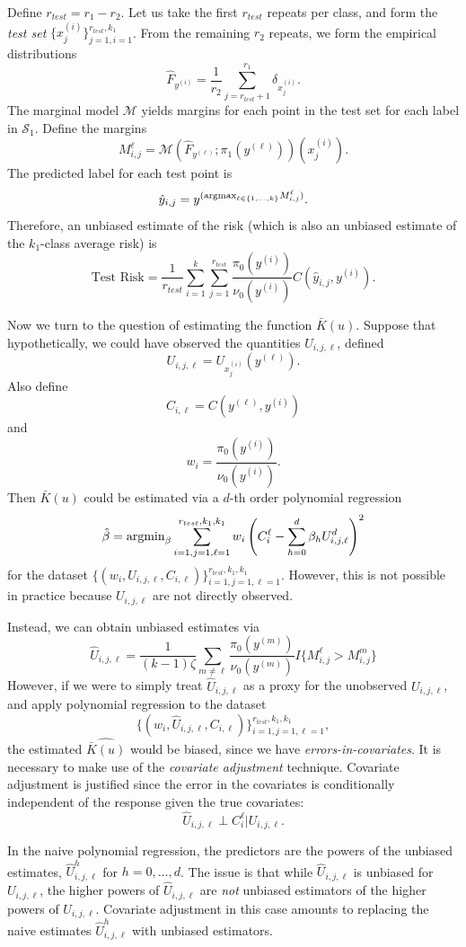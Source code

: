 \documentclass[12pt]{article}
\begin{document}
Define $r_{test} = r_1 - r_2$.  Let us take the first $r_{test}$
repeats per class, and form the \emph{test set} $\{x_j^{(i)}\}_{j=1,
  i=1}^{r_{test}, k_1}$.  From the remaining $r_2$ repeats, we form
the empirical distributions
\[
\hat{F}_{y^{(i)}} = \frac{1}{r_2}\sum_{j=r_{test} + 1}^{r_1} \delta_{x_j^{(i)}}.
\]
The marginal model $\mathcal{M}$ yields margins for each point in the
test set for each label in $\mathcal{S}_1$.  Define the margins
\[
M_{i, j}^\ell = \mathcal{M}(\hat{F}_{y^{(\ell)}}; \pi_1(y^{(\ell)}))(x_j^{(i)}).
\]
The predicted label for each test point is
\[
\hat{y}_{i,j} = y^{(\text{argmax}_{\ell \in \{1,\hdots, k\}} M_{i, j}^\ell)}.
\]
Therefore, an unbiased estimate of the risk (which is also an unbiased
estimate of the $k_1$-class average risk) is
\[
\text{Test Risk} = \frac{1}{r_{test}}\sum_{i=1}^k \sum_{j=1}^{r_{test}} \frac{\pi_0(y^{(i)})}{\nu_0(y^{(i)})} C(\hat{y}_{i, j}, y^{(i)}).
\]

Now we turn to the question of estimating the function $\bar{K}(u)$.
Suppose that hypothetically, we could have observed the quantities
$U_{i, j, \ell}$, defined
\[
U_{i, j, \ell} = U_{x_j^{(i)}}(y^{(\ell)}).
\]
Also define
\[
C_{i,\ell} = C(y^{(\ell)}, y^{(i)})
\]
and
\[
w_i = \frac{\pi_0(y^{(i)})}{\nu_0(y^{(i)})}.
\]
Then $\bar{K}(u)$ could be estimated via a $d$-th order polynomial regression
\[
\hat{\beta} = \text{argmin}_{\beta} \sum_{i=1,j=1, \ell=1}^{r_{test}, k_1, k_1} w_i \left(C_i^\ell - \sum_{h=0}^d \beta_h U_{i,j, \ell}^d\right)^2
\]
for the
dataset $\{(w_i, U_{i,j, \ell}, C_{i,\ell})\}_{i=1, j=1,
  \ell=1}^{r_{test}, k_1, k_1}$.  However, this is not possible in
practice because $U_{i,j,\ell}$ are not directly observed.

Instead, we can obtain unbiased estimates via
\[
\hat{U}_{i,j, \ell} = \frac{1}{(k-1)\zeta}\sum_{m \neq \ell}  \frac{\pi_0(y^{(m)})}{\nu_0(y^{(m)})} I\{M_{i, j}^\ell > M_{i, j}^m\}
\]
However, if we were to simply treat $\hat{U}_{i, j, \ell}$ as a proxy
for the unobserved $U_{i,j,\ell}$, and apply polynomial regression to
the dataset
\[
\{(w_i, \hat{U}_{i,j, \ell}, C_{i, \ell})\}_{i=1, j=1, \ell=1}^{r_{test}, k_1,k_1},
\]
the estimated $\widehat{\bar{K}(u)}$ would be biased, since we have
\emph{errors-in-covariates}.  It is necessary to make use of the
\emph{covariate adjustment} technique.  Covariate adjustment is
justified since the error in the covariates is conditionally
independent of the response given the true covariates:
\[
\hat{U}_{i,j,\ell} \perp C_i^\ell | U_{i, j,\ell}.
\]

In the naive polynomial regression, the predictors are the powers of
the unbiased estimates, $\hat{U}_{i,j,\ell}^h$ for $h = 0,\hdots, d$.
The issue is that while $\hat{U}_{i,j,\ell}$ is unbiased for
$U_{i,j,\ell}$, the higher powers of $\hat{U}_{i,j,\ell}$ are
\emph{not} unbiased estimators of the higher powers of $U_{i,j,\ell}$.
Covariate adjustment in this case amounts to replacing the naive
estimates $\hat{U}_{i,j,\ell}^h$ with unbiased estimators.
\end{document}
